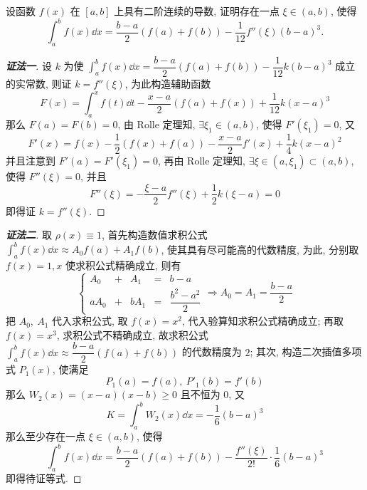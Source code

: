 \begin{example}
    设函数 $f(x)$ 在 $[a,b]$ 上具有二阶连续的导数, 证明存在一点 $\xi\in(a,b)$, 使得
    $$\int_{a}^{b}f(x)\dd x=\dfrac{b-a}{2}(f(a)+f(b))-\dfrac{1}{12}f''(\xi)(b-a)^3.$$
\end{example}
\begin{proof}[{\songti \textbf{证法一}}]
    设 $k$ 为使 $\displaystyle \int_{a}^{b}f(x)\dd x=\dfrac{b-a}{2}(f(a)+f(b))-\dfrac{1}{12}k(b-a)^3$ 成立的实常数, 则证 $k=f''(\xi)$, 为此构造辅助函数
    $$F(x)=\int_{a}^{x}f(t)\dd t-\dfrac{x-a}{2}(f(a)+f(x))+\dfrac{1}{12}k(x-a)^3$$
    那么 $F(a)=F(b)=0$, 由 Rolle 定理知, $\exists\xi_1\in(a,b)$, 使得 $F'(\xi_1)=0$, 又
    $$F'(x)=f(x)-\dfrac{1}{2}(f(x)+f(a))-\dfrac{x-a}{2}f'(x)+\dfrac{1}{4}k(x-a)^2$$
    并且注意到 $F'(a)=F'(\xi_1)=0$, 再由 Rolle 定理知, $\exists\xi\in(a,\xi_1)\subset(a,b)$, 使得 $F''(\xi)=0$, 并且
    $$F''(\xi)=-\dfrac{\xi-a}{2}f''(\xi)+\dfrac{1}{2}k(\xi-a)=0$$
    即得证 $k=f''(\xi).$
\end{proof}
\begin{proof}[{\songti \textbf{证法二}}]
    取 $\rho(x)\equiv1$, 首先构造数值求积公式 $\displaystyle\int_{a}^{b}f(x)\dd x\approx A_0f(a)+A_1f(b)$, 使其具有尽可能高的代数精度, 为此,
    分别取 $f(x)=1,x$ 使求积公式精确成立, 则有 $$\left\{\begin{matrix}
            A_0  & + & A_1  & = & b-a                \\
            aA_0 & + & bA_1 & = & \dfrac{b^2-a^2}{2}
        \end{matrix}\right.\Rightarrow A_0=A_1=\dfrac{b-a}{2} $$
    把 $A_0,~A_1$ 代入求积公式, 取 $f(x)=x^2$, 代入验算知求积公式精确成立; 再取 $f(x)=x^3$, 求积公式不精确成立,
    故求积公式 $\displaystyle\int_{a}^{b}f(x)\dd x\approx\dfrac{b-a}{2}(f(a)+f(b))$ 的代数精度为 $2$;
    其次, 构造二次插值多项式 $P_1(x)$, 使满足 $$P_1(a)=f(a),~P'_1(b)=f'(b)$$
    那么 $W_2(x)=(x-a)(x-b)\geqslant 0$ 且不恒为 $0$, 又
    $$K=\int_{a}^{b}W_2(x)\dd x=-\dfrac{1}{6}(b-a)^3$$
    那么至少存在一点 $\xi\in(a,b)$, 使得
    $$\int_{a}^{b}f(x)\dd x=\dfrac{b-a}{2}(f(a)+f(b))-\dfrac{f''(\xi)}{2!}\cdot\dfrac{1}{6}(b-a)^3$$
    即得待证等式.
\end{proof}

